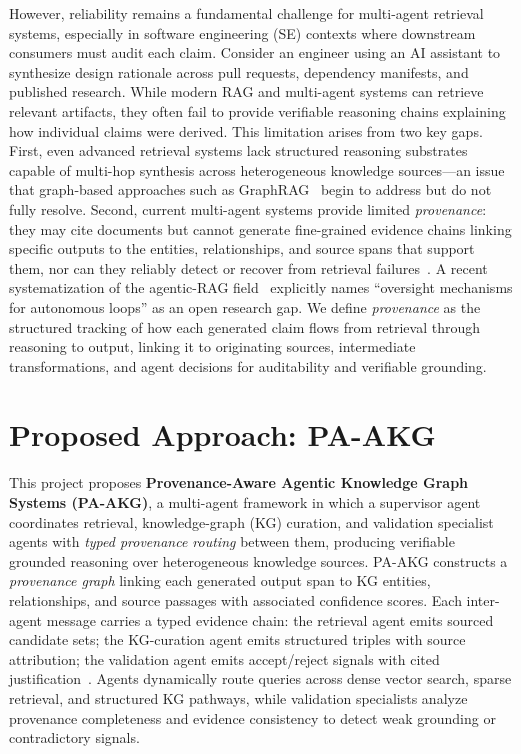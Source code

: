 \documentclass[11pt]{proposalnsf}
\begin{document}
However, reliability remains a fundamental challenge for multi-agent retrieval systems, especially in software engineering (SE) contexts where downstream consumers must audit each claim. Consider an engineer using an AI assistant to synthesize design rationale across pull requests, dependency manifests, and published research. While modern RAG and multi-agent systems can retrieve relevant artifacts, they often fail to provide verifiable reasoning chains explaining how individual claims were derived. This limitation arises from two key gaps. First, even advanced retrieval systems lack structured reasoning substrates capable of multi-hop synthesis across heterogeneous knowledge sources---an issue that graph-based approaches such as GraphRAG~\cite{Edge2024GraphRAG} begin to address but do not fully resolve. Second, current multi-agent systems provide limited \textit{provenance}: they may cite documents but cannot generate fine-grained evidence chains linking specific outputs to the entities, relationships, and source spans that support them, nor can they reliably detect or recover from retrieval failures~\cite{Yan2024CRAG,Ji2023HallucinationSurvey}. A recent systematization of the agentic-RAG field~\cite{Singh2026AgenticRAGSoK} explicitly names ``oversight mechanisms for autonomous loops'' as an open research gap. We define \textit{provenance} as the structured tracking of how each generated claim flows from retrieval through reasoning to output, linking it to originating sources, intermediate transformations, and agent decisions for auditability and verifiable grounding.

\section*{\normalsize Proposed Approach: PA-AKG}

This project proposes \textbf{Provenance-Aware Agentic Knowledge Graph Systems (PA-AKG)}, a multi-agent framework in which a supervisor agent coordinates retrieval, knowledge-graph (KG) curation, and validation specialist agents with \textit{typed provenance routing} between them, producing verifiable grounded reasoning over heterogeneous knowledge sources. PA-AKG constructs a \textit{provenance graph} linking each generated output span to KG entities, relationships, and source passages with associated confidence scores. Each inter-agent message carries a typed evidence chain: the retrieval agent emits sourced candidate sets; the KG-curation agent emits structured triples with source attribution; the validation agent emits accept/reject signals with cited justification~\cite{Asai2024SelfRAG}. Agents dynamically route queries across dense vector search, sparse retrieval, and structured KG pathways, while validation specialists analyze provenance completeness and evidence consistency to detect weak grounding or contradictory signals.
\end{document}

